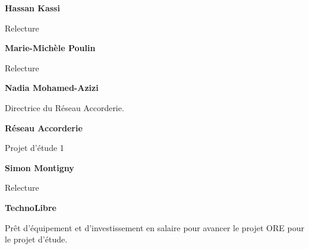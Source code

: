 \textbf{Hassan Kassi}

Relecture

\textbf{Marie-Michèle Poulin}

Relecture

\textbf{Nadia Mohamed-Azizi}

Directrice du Réseau Accorderie.

\textbf{Réseau Accorderie}

Projet d’étude 1


\textbf{Simon Montigny}

Relecture

\textbf{TechnoLibre}

Prêt d’équipement et d'investissement en salaire pour avancer le projet ORE pour le projet d’étude.
